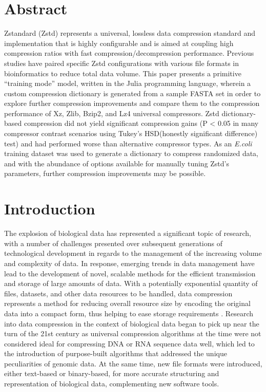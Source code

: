 \documentclass[
  10pt,
  letterpaper,
]{article}
\begin{document}
\section*{Abstract}
Zstandard (Zstd) represents a universal, lossless data compression
standard and implementation that is highly configurable and is aimed at
coupling high compression ratios with fast compression/decompression
performance. Previous studies have paired specific Zstd configurations
with various file formats in bioinformatics to reduce total data volume.
This paper presents a primitive ``training mode'' model, written in the
Julia programming language, wherein a custom compression dictionary is
generated from a sample FASTA set in order to explore further
compression improvements and compare them to the compression performance
of Xz, Zlib, Bzip2, and Lz4 universal compressors. Zstd dictionary-based
compression did not yield significant compression gains (P \textless{}
0.05 in many compressor contrast scenarios using Tukey's HSD(honestly
significant difference) test) and had performed worse than alternative
compressor types. As an \emph{E.coli} training dataset was used to
generate a dictionary to compress randomized data, and with the
abundance of options available for manually tuning Zstd's parameters,
further compression improvements may be possible.


\linenumbers\hypertarget{introduction}{%
\section{Introduction}\label{introduction}}

The explosion of biological data has represented a significant topic of
research, with a number of challenges presented over subsequent
generations of technological development in regards to the management of
the increasing volume and complexity of
data\citep{d2018high, li2014big}. In response, emerging trends in data
management have lead to the development of novel, scalable methods for
the efficient transmission and storage of large amounts of
data\citep{sais2022intelligent}. With a potentially exponential quantity
of files, datasets, and other data resources to be handled, data
compression represents a method for reducing overall resource size by
encoding the original data into a compact form, thus helping to ease
storage requirements \citep{jayasankar2021survey}. Research into data
compression in the context of biological data began to pick up near the
turn of the 21st century as universal compression algorithms at the time
were not considered ideal for compressing DNA or RNA sequence data well,
which led to the introduction of purpose-built algorithms that addressed
the unique peculiarities of genomic data\citep{grumbach1994new}. At the
same time, new file formats were introduced, either text-based or
binary-based, for more accurate structuring and representation of
biological data, complementing new software
tools\citep{lipman1985rapid, mills2014common}.
\end{document}
